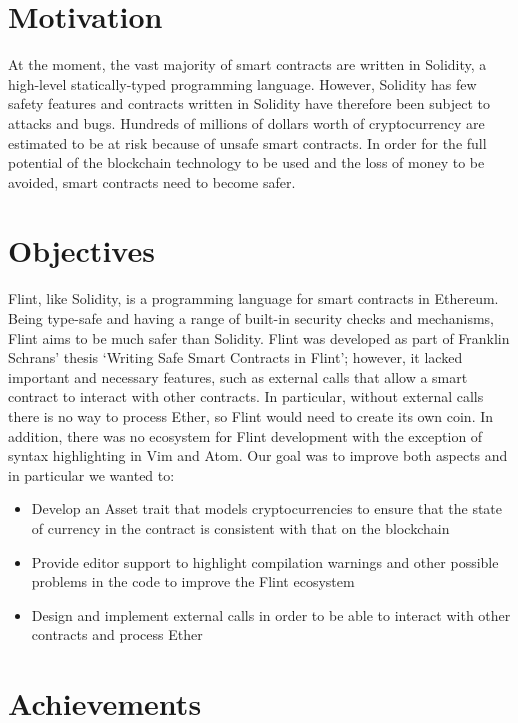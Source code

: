 \section{Motivation}

At the moment, the vast majority of smart contracts are written in Solidity, a high-level statically-typed programming language. However, Solidity has few safety features and contracts written in Solidity have therefore been subject to attacks and bugs. Hundreds of millions of dollars worth of cryptocurrency are estimated to be at risk because of unsafe smart contracts. In order for the full potential of the blockchain technology to be used and the loss of money to be avoided, smart contracts need to become safer.

\section{Objectives}

Flint, like Solidity, is a programming language for smart contracts in Ethereum. Being type-safe and having a range of built-in security checks and mechanisms, Flint aims to be much safer than Solidity. Flint was developed as part of Franklin Schrans' thesis `Writing Safe Smart Contracts in Flint'\cite{flint}; however, it lacked important and necessary features, such as external calls that allow a smart contract to interact with other contracts. In particular, without external calls there is no way to process Ether, so Flint would need to create its own coin. In addition, there was no ecosystem for Flint development with the exception of syntax highlighting in Vim and Atom. Our goal was to improve both aspects and in particular we wanted to:

\begin{itemize}
	\item Develop an Asset trait that models cryptocurrencies to ensure that the state of currency in the contract is consistent with that on the blockchain
	\item Provide editor support to highlight compilation warnings and other possible problems in the code to improve the Flint ecosystem
	\item Design and implement external calls in order to be able to interact with other contracts and process Ether
\end{itemize}

\section{Achievements}

